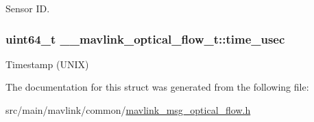 Sensor I\+D. 

\hypertarget{struct____mavlink__optical__flow__t_a01f76c236ab67155fe7770f82eb86ad6}{
\subsubsection[{time\+\_\+usec}]{\setlength{\rightskip}{0pt plus 5cm}uint64\+\_\+t \+\_\+\+\_\+mavlink\+\_\+optical\+\_\+flow\+\_\+t\+::time\+\_\+usec}}\label{struct____mavlink__optical__flow__t_a01f76c236ab67155fe7770f82eb86ad6}


Timestamp (U\+N\+I\+X) 



The documentation for this struct was generated from the following file\+:\begin{DoxyCompactItemize}
\item 
src/main/mavlink/common/\hyperlink{mavlink__msg__optical__flow_8h}{mavlink\+\_\+msg\+\_\+optical\+\_\+flow.\+h}\end{DoxyCompactItemize}
